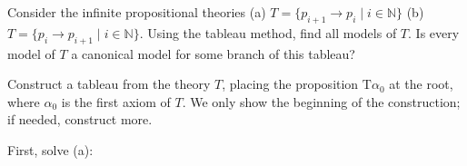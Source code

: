 \begin{problem}

    Consider the infinite propositional theories (a) $T=\{p_{i+1} \to p_i\mid i\in \mathbb{N}\}$ (b) $T=\{p_i \to p_{i+1}\mid i\in \mathbb{N}\}$. Using the tableau method, find all models of $T$. Is every model of $T$ a canonical model for some branch of this tableau? %

    \begin{solution}

        Construct a tableau from the theory $T$, placing the proposition $\mathrm{T}\alpha_0$ at the root, where $\alpha_0$ is the first axiom of $T$. We only show the beginning of the construction; if needed, construct more.

        First, solve (a):
        

\end{solution}
\end{problem}
